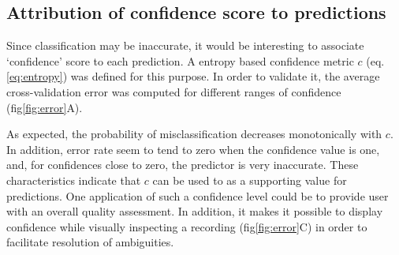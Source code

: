\subsection{Attribution of confidence score to predictions}
Since classification may be inaccurate, it would be interesting to associate `confidence' score to each prediction.
A entropy based confidence metric $c$ (eq. \ref{eq:entropy}) was defined for this purpose.
In order to validate it, the average cross-validation error was computed for different ranges of confidence (fig\ref{fig:error}A).



As expected, the probability of misclassification decreases monotonically with $c$.
In addition, error rate seem to tend to zero when the confidence value is one, and, for confidences close to zero, the predictor is very inaccurate.
These characteristics indicate that $c$ can be used to as a supporting value for predictions.
One application of such a confidence level could be to provide user with an overall quality assessment.
In addition, it  makes it possible to display confidence while visually inspecting a recording (fig\ref{fig:error}C) in order to facilitate resolution of ambiguities.


